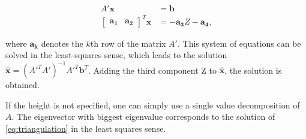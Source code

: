 \begin{align}
    A'\mathbf{x}&=\mathbf{b}\\  
    \begin{bmatrix} \mathbf{a_1} & \mathbf{a_2} \end{bmatrix}^T \mathbf{x} &= -\mathbf{a_3}Z-\mathbf{a_4},
\end{align}

where $\mathbf{a_k}$ denotes the $k$th row of the matrix $A'$.
This system of equations can be solved in the least-squares sense, which leads to the solution $\mathbf{\hat{x}}=(A'^TA')^{-1}A'^T\mathbf{b}^T$. 
Adding the third component Z to $\mathbf{\hat{x}}$, the solution is obtained.

If the height is not specified, one can simply use a single value decomposition of $A$. The eigenvector with biggest eigenvalue corresponds to the solution of \eqref{eq:triangulation} in the least squares sense.


%	
%	
